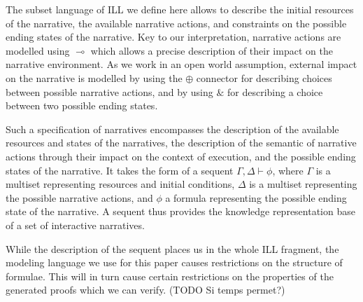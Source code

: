 \documentclass[runningheads,a4paper]{llncs}
\begin{document}
The subset language of ILL we define here allows to describe the initial resources of the narrative, the available narrative actions, and constraints on the possible ending states of the narrative. Key to our interpretation, narrative actions are modelled using $\multimap$ which allows a precise description of their impact on the narrative environment. As we work in an open world assumption, external impact on the narrative is modelled by using the $\oplus$ connector for describing choices between possible narrative actions, and by using $\&$ for describing a choice between two possible ending states.

Such a specification of narratives encompasses the description of the available resources and states of the narratives, the description of the semantic of narrative actions through their impact on the context of execution, and the possible ending states of the narrative. It takes the form of a sequent $\Gamma , \Delta \vdash \phi$, where $\Gamma$ is a multiset representing resources and initial conditions, $\Delta$ is a multiset representing the possible narrative actions, and $\phi$ a formula representing the possible ending state of the narrative. A sequent thus provides the knowledge representation base of a set of interactive narratives. 

While the description of the sequent places us in the whole ILL fragment, the modeling language we use for this paper causes restrictions on the structure of formulae. This will in turn cause certain restrictions on the properties of the generated proofs which we can verify. (TODO Si temps permet?)
%
\end{document}
